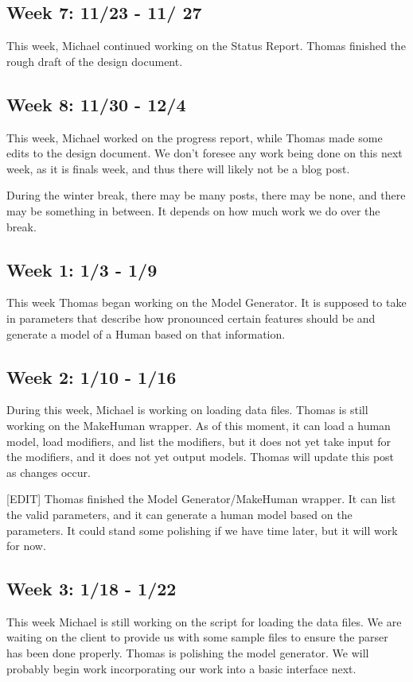 \documentclass[letterpaper,10pt, onecolumn, draftclsnofoot]{IEEEtran}
\begin{document}
\subsection{Week 7: 11/23 - 11/ 27}
This week, Michael continued working on the Status Report. Thomas finished the rough draft of the design document.

\subsection{Week 8: 11/30 - 12/4}
This week, Michael worked on the progress report, while Thomas made some edits to the design document. We don't foresee any work being done on this next week, as it is finals week, and thus there will likely not be a blog post. 

During the winter break, there may be many posts, there may be none, and there may be something in between. It depends on how much work we do over the break.

\subsection{Week 1: 1/3 - 1/9}
This week Thomas began working on the Model Generator. It is supposed to take in parameters that describe how pronounced certain features should be and generate a model of a Human based on that information.

\subsection{Week 2: 1/10 - 1/16}
During this week, Michael is working on loading data files. Thomas is still working on the MakeHuman wrapper. As of this moment, it can load a human model, load modifiers, and list the modifiers, but it does not yet take input for the modifiers, and it does not yet output models. Thomas will update this post as changes occur.

[EDIT] Thomas finished the Model Generator/MakeHuman wrapper.  It can list the valid parameters, and it can generate a human model based on the parameters. It could stand some polishing if we have time later, but it will work for now.

\subsection{Week 3: 1/18 - 1/22}
This week Michael is still working on the script for loading the data files. We are waiting on the client to provide us with some sample files to ensure the parser has been done properly. Thomas is polishing the model generator. We will probably begin work incorporating our work into a basic interface next.
\end{document}
